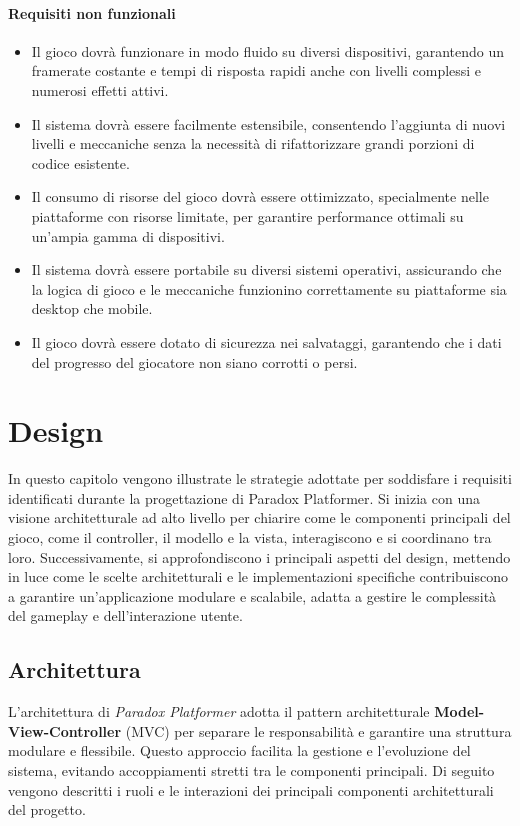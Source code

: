 \documentclass[a4paper,12pt]{report}
\begin{document}
\subsubsection{Requisiti non funzionali}
\begin{itemize}
\item Il gioco dovrà funzionare in modo fluido su diversi dispositivi, garantendo un framerate costante e tempi di risposta rapidi anche con livelli complessi e numerosi effetti attivi.
\item Il sistema dovrà essere facilmente estensibile, consentendo l’aggiunta di nuovi livelli e meccaniche senza la necessità di rifattorizzare grandi porzioni di codice esistente.
\item Il consumo di risorse del gioco dovrà essere ottimizzato, specialmente nelle piattaforme con risorse limitate, per garantire performance ottimali su un’ampia gamma di dispositivi.
\item Il sistema dovrà essere portabile su diversi sistemi operativi, assicurando che la logica di gioco e le meccaniche funzionino correttamente su piattaforme sia desktop che mobile.
\item Il gioco dovrà essere dotato di sicurezza nei salvataggi, garantendo che i dati del progresso del giocatore non siano corrotti o persi.
\end{itemize}

\chapter{Design}

In questo capitolo vengono illustrate le strategie adottate per soddisfare i requisiti identificati durante la progettazione di Paradox Platformer. Si inizia con una visione architetturale ad alto livello per chiarire come le componenti principali del gioco, come il controller, il modello e la vista, interagiscono e si coordinano tra loro. Successivamente, si approfondiscono i principali aspetti del design, mettendo in luce come le scelte architetturali e le implementazioni specifiche contribuiscono a garantire un'applicazione modulare e scalabile, adatta a gestire le complessità del gameplay e dell'interazione utente.

\section{Architettura}

L'architettura di \textit{Paradox Platformer} adotta il pattern architetturale \textbf{Model-View-Controller} (MVC) per separare le responsabilità e garantire una struttura modulare e flessibile. Questo approccio facilita la gestione e l'evoluzione del sistema, evitando accoppiamenti stretti tra le componenti principali. Di seguito vengono descritti i ruoli e le interazioni dei principali componenti architetturali del progetto.
\end{document}
